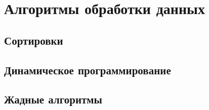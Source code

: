 \chapter{Алгоритмы обработки данных}

\section{Сортировки}

\section{Динамическое программирование}

\section{Жадные алгоритмы}
